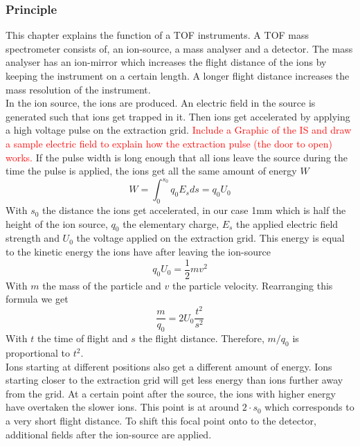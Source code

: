 	\subsubsection{Principle} %
	This chapter explains the function of a TOF instruments. A TOF mass spectrometer consists of, an ion-source, a mass analyser and a detector. The mass analyser has an ion-mirror which increases the flight distance of the ions by keeping the instrument on a certain length. A longer flight distance increases the mass resolution of the instrument.\\%
	In the ion source, the ions are produced. An electric field in the source is generated such that ions get trapped in it. Then ions get accelerated by applying a high voltage pulse on the extraction grid. \textcolor{red}{Include a Graphic of the IS and draw a sample electric field to explain how the extraction pulse (the door to open) works.}
	If the pulse width is long enough that all ions leave the source during the time the pulse is applied, the ions get all the same amount of energy $W$
	\begin{equation}
		W = \int_{0}^{s_0}q_0 E_s ds = q_0 U_0
	\end{equation}
	With $s_0$ the distance the ions get accelerated, in our case 1\si{\milli\metre} which is half the height of the ion source, $q_0$ the elementary charge, $E_s$ the applied electric field strength and $U_0$ the voltage applied on the extraction grid. This energy is equal to the kinetic energy the ions have after leaving the ion-source
	\begin{equation}
		q_0 U_0 = \frac{1}{2}m v^2
	\end{equation}
	With $m$ the mass of the particle and $v$ the particle velocity. Rearranging this formula we get
	\begin{equation}
		\frac{m}{q_0} = 2 U_0\frac{t^2}{s^2}
		\label{eq:m/q}
	\end{equation}
	With $t$ the time of flight and $s$ the flight distance. Therefore, $m/q_0$ is proportional to $t^2$.\\
	Ions starting at different positions also get a different amount of energy. Ions starting closer to the extraction grid will get less energy than ions further away from the grid. At a certain point after the source, the ions with higher energy have overtaken the slower ions. This point is at around $2\cdot s_0$ which corresponds to a very short flight distance. To shift this focal point onto to the detector, additional fields after the ion-source are applied.\\
